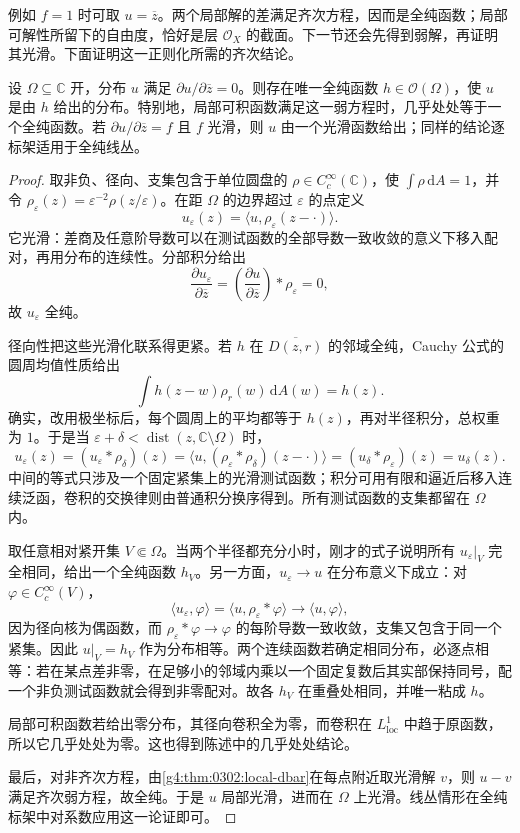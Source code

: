 例如 \(f=1\) 时可取 \(u=\overline z\)。两个局部解的差满足齐次方程，因而是全纯函数；局部可解性所留下的自由度，恰好是层 \(\mathcal O_X\) 的截面。下一节还会先得到弱解，再证明其光滑。下面证明这一正则化所需的齐次结论。

\begin{lemma}
\label{g4:lem:0302:weak-weyl}
设 \(\Omega\subseteq\mathbb C\) 开，分布 \(u\) 满足 \(\partial u/\partial\overline z=0\)。则存在唯一全纯函数 \(h\in\mathcal O(\Omega)\)，使 \(u\) 是由 \(h\) 给出的分布。特别地，局部可积函数满足这一弱方程时，几乎处处等于一个全纯函数。若 \(\partial u/\partial\overline z=f\) 且 \(f\) 光滑，则 \(u\) 由一个光滑函数给出；同样的结论逐标架适用于全纯线丛。
\end{lemma}
\begin{proof}
取非负、径向、支集包含于单位圆盘的 \(\rho\in C_c^\infty(\mathbb C)\)，使 \(\int\rho\,\mathrm{d}A=1\)，并令 \(\rho_\varepsilon(z)=\varepsilon^{-2}\rho(z/\varepsilon)\)。在距 \(\Omega\) 的边界超过 \(\varepsilon\) 的点定义
\[
 u_\varepsilon(z)=\langle u,\rho_\varepsilon(z-\cdot)\rangle.
\]
它光滑：差商及任意阶导数可以在测试函数的全部导数一致收敛的意义下移入配对，再用分布的连续性。分部积分给出
\[
 \frac{\partial u_\varepsilon}{\partial\overline z}
 =\left(\frac{\partial u}{\partial\overline z}\right)*\rho_\varepsilon=0,
\]
故 \(u_\varepsilon\) 全纯。

径向性把这些光滑化联系得更紧。若 \(h\) 在 \(\overline{D(z,r)}\) 的邻域全纯，Cauchy 公式的圆周均值性质给出
\[
 \int h(z-w)\rho_r(w)\,\mathrm{d}A(w)=h(z).
\]
确实，改用极坐标后，每个圆周上的平均都等于 \(h(z)\)，再对半径积分，总权重为 \(1\)。于是当 \(\varepsilon+\delta<\operatorname{dist}(z,\mathbb C\setminus\Omega)\) 时，
\[
 u_\varepsilon(z)
 =(u_\varepsilon*\rho_\delta)(z)
 =\langle u,(\rho_\varepsilon*\rho_\delta)(z-\cdot)\rangle
 =(u_\delta*\rho_\varepsilon)(z)
 =u_\delta(z).
\]
中间的等式只涉及一个固定紧集上的光滑测试函数；积分可用有限和逼近后移入连续泛函，卷积的交换律则由普通积分换序得到。所有测试函数的支集都留在 \(\Omega\) 内。

取任意相对紧开集 \(V\Subset\Omega\)。当两个半径都充分小时，刚才的式子说明所有 \(u_\varepsilon|_V\) 完全相同，给出一个全纯函数 \(h_V\)。另一方面，\(u_\varepsilon\to u\) 在分布意义下成立：对 \(\varphi\in C_c^\infty(V)\)，
\[
 \langle u_\varepsilon,\varphi\rangle
 =\langle u,\rho_\varepsilon*\varphi\rangle\longrightarrow\langle u,\varphi\rangle,
\]
因为径向核为偶函数，而 \(\rho_\varepsilon*\varphi\to\varphi\) 的每阶导数一致收敛，支集又包含于同一个紧集。因此 \(u|_V=h_V\) 作为分布相等。两个连续函数若确定相同分布，必逐点相等：若在某点差非零，在足够小的邻域内乘以一个固定复数后其实部保持同号，配一个非负测试函数就会得到非零配对。故各 \(h_V\) 在重叠处相同，并唯一粘成 \(h\)。

局部可积函数若给出零分布，其径向卷积全为零，而卷积在 \(L^1_{\mathrm{loc}}\) 中趋于原函数，所以它几乎处处为零。这也得到陈述中的几乎处处结论。

最后，对非齐次方程，由\cref{g4:thm:0302:local-dbar}在每点附近取光滑解 \(v\)，则 \(u-v\) 满足齐次弱方程，故全纯。于是 \(u\) 局部光滑，进而在 \(\Omega\) 上光滑。线丛情形在全纯标架中对系数应用这一论证即可。
\end{proof}
